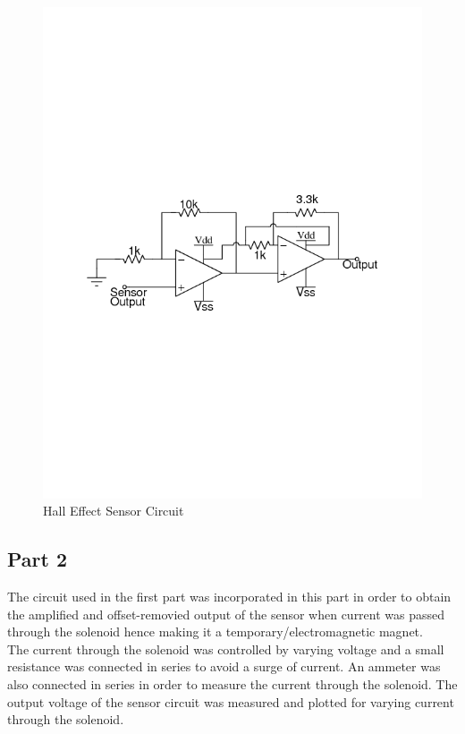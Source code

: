 \documentclass[12pt]{article}
\begin{document}
\begin{figure}[H]
	\centering
	\includegraphics[width = 0.9\linewidth, trim = {0 10.25cm 0 10.5cm}, clip]{Hall_Effect_Sensor_Circuit.png}
	\caption{Hall Effect Sensor Circuit}
\end{figure}

\subsection{Part 2}

The circuit used in the first part was incorporated in this part in order to obtain the amplified and offset-removied output of the sensor when current was passed through the solenoid hence making it a temporary/electromagnetic magnet.\\
The current through the solenoid was controlled by varying voltage and a small resistance was connected in series to avoid a surge of current. An ammeter was also connected in series in order to measure the current through the solenoid. The output voltage of the sensor circuit was measured and plotted for varying current through the solenoid.
\end{document}
